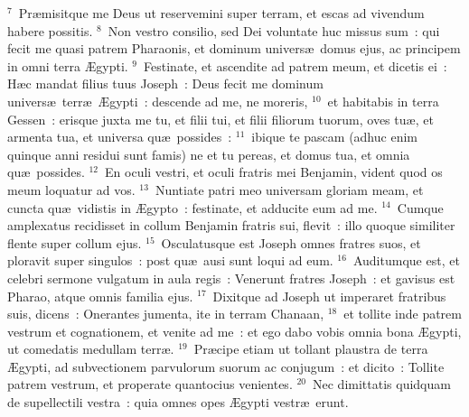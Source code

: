 ${}^{7}$~Pr\ae misitque me Deus ut reservemini super terram, et escas ad vivendum habere possitis.
${}^{8}$~Non vestro consilio, sed Dei voluntate huc missus sum~: qui fecit me quasi patrem Pharaonis, et dominum univers\ae\ domus ejus, ac principem in omni terra \AE gypti.
${}^{9}$~Festinate, et ascendite ad patrem meum, et dicetis ei~: H\ae c mandat filius tuus Joseph~: Deus fecit me dominum univers\ae\ terr\ae\ \AE gypti~: descende ad me, ne moreris,
${}^{10}$~et habitabis in terra Gessen~: erisque juxta me tu, et filii tui, et filii filiorum tuorum, oves tu\ae , et armenta tua, et universa qu\ae\ possides~:
${}^{11}$~ibique te pascam (adhuc enim quinque anni residui sunt famis) ne et tu pereas, et domus tua, et omnia qu\ae\ possides.
${}^{12}$~En oculi vestri, et oculi fratris mei Benjamin, vident quod os meum loquatur ad vos.
${}^{13}$~Nuntiate patri meo universam gloriam meam, et cuncta qu\ae\ vidistis in \AE gypto~: festinate, et adducite eum ad me.
${}^{14}$~Cumque amplexatus recidisset in collum Benjamin fratris sui, flevit~: illo quoque similiter flente super collum ejus.
${}^{15}$~Osculatusque est Joseph omnes fratres suos, et ploravit super singulos~: post qu\ae\ ausi sunt loqui ad eum.
${}^{16}$~Auditumque est, et celebri sermone vulgatum in aula regis~: Venerunt fratres Joseph~: et gavisus est Pharao, atque omnis familia ejus.
${}^{17}$~Dixitque ad Joseph ut imperaret fratribus suis, dicens~: Onerantes jumenta, ite in terram Chanaan,
${}^{18}$~et tollite inde patrem vestrum et cognationem, et venite ad me~: et ego dabo vobis omnia bona \AE gypti, ut comedatis medullam terr\ae .
${}^{19}$~Pr\ae cipe etiam ut tollant plaustra de terra \AE gypti, ad subvectionem parvulorum suorum ac conjugum~: et dicito~: Tollite patrem vestrum, et properate quantocius venientes.
${}^{20}$~Nec dimittatis quidquam de supellectili vestra~: quia omnes opes \AE gypti vestr\ae\ erunt.


